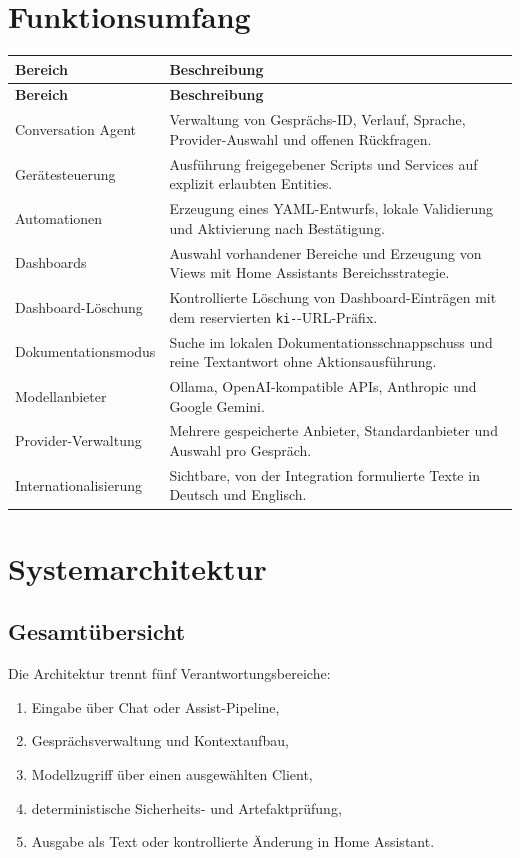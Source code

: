 \documentclass[
  11pt,
  a4paper,
  oneside,
  parskip=half
]{scrreprt}
\newcommand{\code}[1]{\texttt{#1}}
\begin{document}
\chapter{Funktionsumfang}

\begin{longtable}{@{}L{37mm}L{105mm}@{}}
  \toprule
  \textbf{Bereich} & \textbf{Beschreibung} \\
  \midrule
  \endfirsthead
  \toprule
  \textbf{Bereich} & \textbf{Beschreibung} \\
  \midrule
  \endhead
  Conversation Agent &
    Verwaltung von Gesprächs-ID, Verlauf, Sprache, Provider-Auswahl und offenen
    Rückfragen. \\
  Gerätesteuerung &
    Ausführung freigegebener Scripts und Services auf explizit erlaubten Entities. \\
  Automationen &
    Erzeugung eines YAML-Entwurfs, lokale Validierung und Aktivierung nach Bestätigung. \\
  Dashboards &
    Auswahl vorhandener Bereiche und Erzeugung von Views mit Home Assistants
    Bereichsstrategie. \\
  Dashboard-Löschung &
    Kontrollierte Löschung von Dashboard-Einträgen mit dem reservierten
    \code{ki-}-URL-Präfix. \\
  Dokumentationsmodus &
    Suche im lokalen Dokumentationsschnappschuss und reine Textantwort ohne
    Aktionsausführung. \\
  Modellanbieter &
    Ollama, OpenAI-kompatible APIs, Anthropic und Google Gemini. \\
  Provider-Verwaltung &
    Mehrere gespeicherte Anbieter, Standardanbieter und Auswahl pro Gespräch. \\
  Internationalisierung &
    Sichtbare, von der Integration formulierte Texte in Deutsch und Englisch. \\
  \bottomrule
\end{longtable}

\chapter{Systemarchitektur}

\section{Gesamtübersicht}

Die Architektur trennt fünf Verantwortungsbereiche:

\begin{enumerate}
  \item Eingabe über Chat oder Assist-Pipeline,
  \item Gesprächsverwaltung und Kontextaufbau,
  \item Modellzugriff über einen ausgewählten Client,
  \item deterministische Sicherheits- und Artefaktprüfung,
  \item Ausgabe als Text oder kontrollierte Änderung in Home Assistant.
\end{enumerate}
\end{document}
